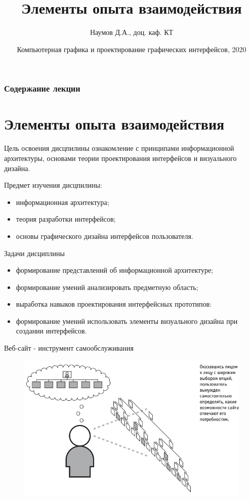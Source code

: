 \documentclass{beamer}
\title[UX Elements]{Элементы опыта взаимодействия}
\author{Наумов Д.А., доц. каф. КТ}
\date[09.09.2020] {Компьютерная графика и проектирование графических интерфейсов, 2020}
\begin{document}
\begin{frame}
  \titlepage
\end{frame}
  
\begin{frame}
  \frametitle{Содержание лекции}
  \tableofcontents  
\end{frame}

\section{Элементы опыта взаимодействия}
  
\begin{frame}[t]
\begin{block}{Цель освоения дисцпилины}
ознакомление с принципами информационной архитектуры, основами теории проектирования интерфейсов и визуального дизайна.
\end{block}
\begin{block}{Предмет изучения дисцпилины:}
\begin{itemize}
\item информационная архитектура;
\item теория разработки интерфейсов;
\item основы графического дизайна интерфейсов пользователя.
\end{itemize}
\end{block}
\begin{block}{Задачи дисциплины}
\begin{itemize}
\item формирование представлений об информационной архитектуре; 
\item формирование умений анализировать предметную область;
\item выработка навыков проектирования интерфейсных прототипов: 
\item формирование умений использовать элементы визуального дизайна при создании интерфейсов.
\end{itemize}
\end{block}
\end{frame}  

\begin{frame}{Веб-сайт - инструмент самообслуживания}
\begin{figure}[h]
\centering
\includegraphics[scale=0.5]{images/lec01-pic01.png}
\end{figure}
\end{frame}
\end{document}
